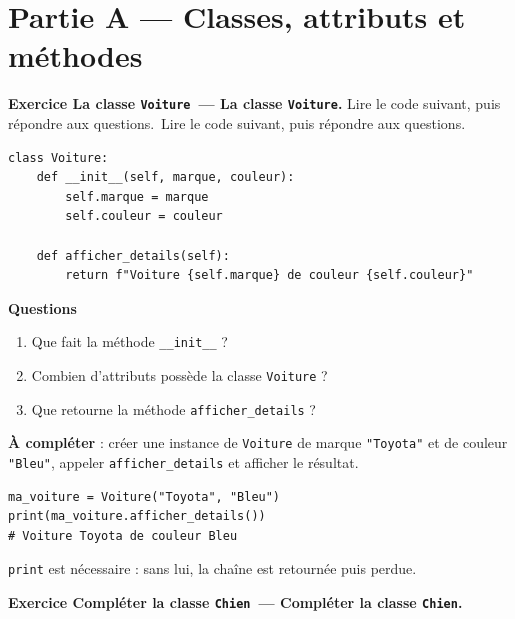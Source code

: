 \documentclass[11pt,a4paper]{article}
\newif\ifcorrige
\newcommand{\py}[1]{\texttt{#1}}
\newcounter{exo}[section]
\renewcommand{\theexo}{\arabic{exo}}
\newcommand{\exo}[2][]{%
  \Needspace{5cm}\stepcounter{exo}%
  \begin{quest}\textbf{Exercice \theexo\ifx\relax#1\relax\else\ — #1\fi.}
  \ifx\relax#2\relax\else\ #2\fi\end{quest}}
\newcommand{\rep}[1]{%
  \ifcorrige
    \par\smallskip{\color{corr}\small#1}\par\smallskip
  \else
    \par\nobreak\vspace{1mm}\noindent\color{black!55}\dotfill\par
    \noindent\color{black!55}\dotfill\par\color{black}\vspace{1mm}
  \fi}
\newcommand{\zonecode}[1][4cm]{%
  \ifcorrige\else
    \par\smallskip\noindent
    \begin{tcolorbox}[colback=white,colframe=black!45,boxrule=0.5pt,arc=1pt,height=#1]\end{tcolorbox}%
  \fi}
\newenvironment{solution}
  {\ifcorrige
     \begin{tcolorbox}[enhanced,breakable,colback=corrbg,colframe=corr,boxrule=0.6pt,arc=1pt,
       left=5pt,right=5pt,top=4pt,bottom=4pt,
       title={Corrigé},coltitle=corr,fonttitle=\bfseries\small,detach title,
       before upper={\tcbtitle\par\smallskip},fontupper=\small]%
   \else
     \setbox0\vbox\bgroup
   \fi}
  {\ifcorrige\end{tcolorbox}\else\egroup\fi}
\begin{document}
\section*{Partie A --- Classes, attributs et méthodes}
\setcounter{exo}{0}

\exo[La classe \py{Voiture}]{Lire le code suivant, puis répondre aux questions.}

\begin{lstlisting}
class Voiture:
    def __init__(self, marque, couleur):
        self.marque = marque
        self.couleur = couleur

    def afficher_details(self):
        return f"Voiture {self.marque} de couleur {self.couleur}"
\end{lstlisting}

\textbf{Questions}
\begin{enumerate}
  \item Que fait la méthode \py{__init__} ?
    \rep{C'est le \textbf{constructeur}. Il est appelé automatiquement à la création de l'objet
    et initialise les attributs d'instance \py{self.marque} et \py{self.couleur} à partir des
    valeurs passées en paramètres.}
  \item Combien d'attributs possède la classe \py{Voiture} ?
    \rep{Deux attributs d'instance : \py{marque} et \py{couleur}.}
  \item Que retourne la méthode \py{afficher_details} ?
    \rep{Une chaîne de caractères (\py{str}) construite par une f-string, par exemple
    \py{"Voiture Toyota de couleur Bleu"}. Elle \emph{retourne} la chaîne, elle ne l'affiche pas.}
\end{enumerate}

\textbf{À compléter} : créer une instance de \py{Voiture} de marque \py{"Toyota"} et de couleur
\py{"Bleu"}, appeler \py{afficher_details} et afficher le résultat.
\zonecode[3cm]
\begin{solution}
\begin{lstlisting}
ma_voiture = Voiture("Toyota", "Bleu")
print(ma_voiture.afficher_details())
# Voiture Toyota de couleur Bleu
\end{lstlisting}
\py{print} est nécessaire : sans lui, la chaîne est retournée puis perdue.
\end{solution}

\exo[Compléter la classe \py{Chien}]{}
\end{document}
